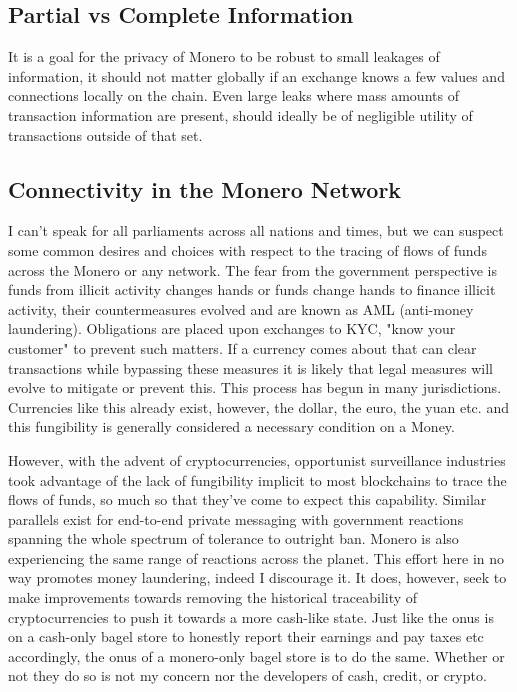 \subsection{Partial vs Complete Information}

It is a goal for the privacy of Monero to be robust to small leakages of information, it should not matter globally if an exchange knows a few values and connections locally on the chain.
Even large leaks where mass amounts of transaction information are present, should ideally be of negligible utility of transactions outside of that set.

\subsection{Connectivity in the Monero Network}

I can't speak for all parliaments across all nations and times, but we can suspect some common desires and choices with respect to the tracing of flows of funds across the Monero or any network.  
The fear from the government perspective is funds from illicit activity changes hands or funds change hands to finance illicit activity, their countermeasures evolved and are known as \gls{AML}  (anti-money laundering).  
Obligations are placed upon exchanges to \gls{KYC}, "know your customer" to prevent such matters.  
If a currency comes about that can clear transactions while bypassing these measures it is likely that legal measures will evolve to mitigate or prevent this.  
This process has begun in many jurisdictions.
Currencies like this already exist, however, the dollar, the euro, the yuan etc. and this fungibility is generally considered a necessary condition on a Money.  

However, with the advent of cryptocurrencies, opportunist surveillance industries took advantage of the lack of fungibility implicit to most blockchains to trace the flows of funds, so much so that they've come to expect this capability. 
Similar parallels exist for end-to-end private messaging with government reactions spanning the whole spectrum of tolerance to outright ban.  
Monero is also experiencing the same range of reactions across the planet.  
This effort here in no way promotes money laundering, indeed I discourage it.  
It does, however, seek to make improvements towards removing the historical traceability of cryptocurrencies to push it towards a more cash-like state.
Just like the onus is on a cash-only bagel store to honestly report their earnings and pay taxes etc accordingly, the onus of a monero-only bagel store is to do the same.  
Whether or not they do so is not my concern nor the developers of cash, credit, or crypto.  

